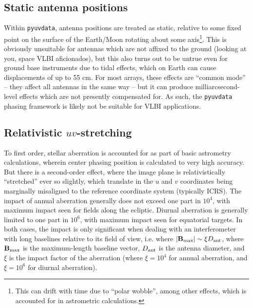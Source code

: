 \documentclass[11pt, oneside]{article}
\begin{document}
\subsection{Static antenna positions}
Within \texttt{pyuvdata}, antenna positions are treated as static, relative to some fixed point on the surface of the Earth/Moon rotating about some axis\footnote{This can drift with time due to ``polar wobble'', among other effects, which is accounted for in astrometric calculations.}. This is obviously unsuitable for antennas which are not affixed to the ground (looking at you, space VLBI aficionados), but this also turns out to be untrue even for ground base instruments due to tidal effects, which on Earth can cause displacements of up to 55 cm. For most arrays, these effects are ``common mode'' -- they affect all antennas in the same way -- but it can produce milliarcsecond-level effects which are not presently compensated for. As such, the \texttt{pyuvdata} phasing framework is likely not be suitable for VLBI applications.

\subsection{Relativistic $uv$-stretching}
To first order, stellar aberration is accounted for as part of basic astrometry calculations, wherein center phasing position is calculated to very high accuracy. But there is a second-order effect, where the image plane is relativistically ``stretched'' ever so slightly, which translate in the $u$ and $v$ coordinates being marginally misaligned to the reference coordinate system (typically ICRS). The impact of annual aberration generally does not exceed one part in $10^{4}$, with maximum impact seen for fields along the ecliptic. Diurnal aberration is generally limited to one part in $10^{6}$, with maximum impact seen for equatorial targets. In both cases, the impact is only significant when dealing with an interferometer with long baselines relative to its field of view, i.e. where $|\mathbf{B}_{\rm max}| \sim \xi D_{\rm ant}$, where $\mathbf{B}_{\rm max}$ is the maximum-length baseline vector, $D_{\rm ant}$ is the antenna diameter, and $\xi$ is the impact factor of the aberration (where $\xi=10^{4}$ for annual aberration, and $\xi=10^{6}$ for diurnal aberration).
\end{document}
